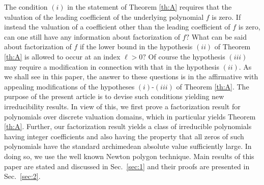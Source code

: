 \documentclass[12pt]{amsart}%
\begin{document}
The condition $(i)$ in the statement of  Theorem \ref{th:A} requires that the valuation of the leading coefficient of the underlying polynomial $f$ is zero. If  instead the valuation of a coefficient other than the leading coefficient of $f$ is zero,  can one still have any information about factorization of $f?$ What can be said about factorization of $f$ if the lower bound in the hypothesis $(ii)$ of Theorem \ref{th:A} is  allowed to occur at an index $\ell>0?$ Of course the  hypothesis $(iii)$ may require a modification in connection with that in the hypothesis $(ii)$. As we shall see in this paper, the answer to these questions is in the affirmative with appealing modifications of the hypotheses $(i)$-$(iii)$ of Theorem \ref{th:A}.
The purpose of the present article is to devise such conditions yielding new irreducibility results.  In view of this,  we first prove  a factorization result for polynomials over discrete valuation domains, which in particular yields Theorem \ref{th:A}. Further, our factorization result yields a class of irreducible polynomials having integer coefficients and also having the property that all zeros of such polynomials have the standard archimedean absolute value sufficiently large. In doing so, we use the well known Newton polygon technique. Main results of this paper are stated and discussed in Sec.~\ref{sec:1} and their proofs are presented in Sec.~\ref{sec:2}.
\end{document}
